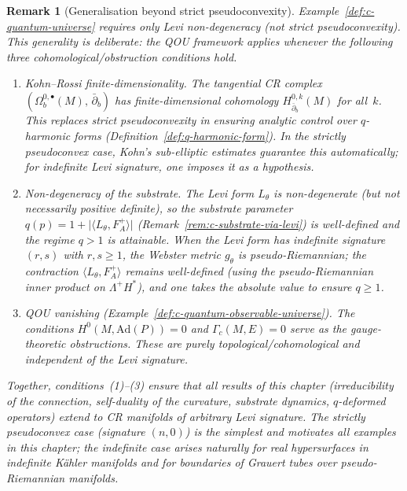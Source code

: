 \documentclass[12pt,a4paper]{report}
\newtheorem{remark}[theorem]{Remark}
\begin{document}
\begin{remark}[Generalisation beyond strict pseudoconvexity]
\label{rem:levi-generalisation}
Example~\ref{def:c-quantum-universe} requires only Levi non-degeneracy
(not strict pseudoconvexity).  This generality is deliberate: the QOU
framework applies whenever the following three cohomological/obstruction
conditions hold.

\begin{enumerate}
  \item \emph{Kohn--Rossi finite-dimensionality.}\;
        The tangential CR complex
        $(\Omega^{0,\bullet}_b(M),\, \bar\partial_b)$ has
        finite-dimensional cohomology
        $H^{0,k}_{\bar\partial_b}(M)$ for all~$k$.  This replaces
        strict pseudoconvexity in ensuring analytic control over
        $q$-harmonic forms (Definition~\ref{def:q-harmonic-form}).
        In the strictly pseudoconvex case, Kohn's sub-elliptic
        estimates guarantee this automatically; for indefinite
        Levi signature, one imposes it as a hypothesis.
  \item \emph{Non-degeneracy of the substrate.}\;
        The Levi form $L_\theta$ is non-degenerate (but not necessarily
        positive definite), so the substrate parameter
        $q(p) = 1 + \lvert\langle L_\theta, F_A^+\rangle\rvert$
        (Remark~\ref{rem:c-substrate-via-levi}) is well-defined and
        the regime $q > 1$ is attainable.  When the Levi form has
        indefinite signature $(r,s)$ with $r,s \geq 1$, the Webster
        metric $g_\theta$ is pseudo-Riemannian; the contraction
        $\langle L_\theta, F_A^+\rangle$ remains well-defined (using
        the pseudo-Riemannian inner product on $\Lambda^+ H^*$), and
        one takes the absolute value to ensure $q \geq 1$.
  \item \emph{QOU vanishing (Example~\ref{def:c-quantum-observable-universe}).}\;
        The conditions $H^0(M, \mathrm{Ad}(P)) = 0$ and
        $\Gamma_c(M,E) = 0$ serve as the gauge-theoretic obstructions.
        These are purely topological/cohomological and independent of the
        Levi signature.
\end{enumerate}

\noindent
Together, conditions~(1)--(3) ensure that all results of this chapter
(irreducibility of the connection, self-duality of the curvature,
substrate dynamics, $q$-deformed operators) extend to CR manifolds of
arbitrary Levi signature.  The strictly pseudoconvex case (signature
$(n,0)$) is the simplest and motivates all examples in this chapter;
the indefinite case arises naturally for real hypersurfaces in
indefinite K\"ahler manifolds and for boundaries of
Grauert tubes over pseudo-Riemannian manifolds.
\end{remark}
\end{document}
